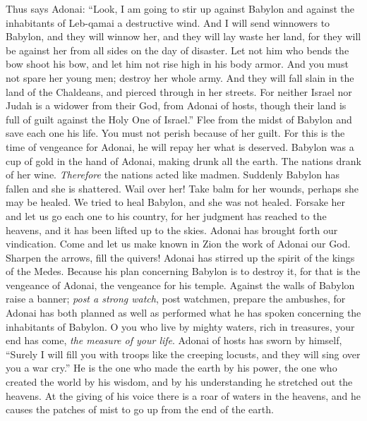 \begin{biblechapter} %
\verse Thus says Adonai:
\verse “Look, I am going to stir up against Babylon 
and against the inhabitants of Leb-qamai a destructive wind.
\verse And I will send winnowers to Babylon, 
and they will winnow her, 
and they will lay waste her land, 
for they will be against her from all sides on the day of disaster.
\verse Let not him who bends the bow shoot his bow, 
and let him not rise high in his body armor. 
And you must not spare her young men; 
destroy her whole army.
\verse And they will fall slain in the land of the Chaldeans, 
and pierced through in her streets.
\verse For neither Israel nor Judah is a widower from their God, 
from Adonai of hosts, 
though their land is full of guilt 
against the Holy One of Israel.”
\verse Flee from the midst of Babylon and save each one his life. 
You must not perish because of her guilt. 
For this is the time of vengeance for Adonai, 
he will repay her what is deserved.
\verse Babylon was a cup of gold in the hand of Adonai, 
making drunk all the earth. 
The nations drank of her wine. 
\textit{Therefore} the nations acted like madmen.
\verse Suddenly Babylon has fallen and she is shattered. 
Wail over her! 
Take balm for her wounds, 
perhaps she may be healed.
\verse We tried to heal Babylon, and she was not healed. 
Forsake her and let us go each one to his country, 
for her judgment has reached to the heavens, 
and it has been lifted up to the skies.
\verse Adonai has brought forth our vindication. 
Come and let us make known in Zion the work of Adonai our God.
\verse Sharpen the arrows, fill the quivers! 
Adonai has stirred up the spirit of the kings of the Medes. 
Because his plan concerning Babylon is to destroy it, 
for that is the vengeance of Adonai, 
the vengeance for his temple.
\verse Against the walls of Babylon raise a banner; 
\textit{post a strong watch}, post watchmen, prepare the ambushes, 
for Adonai has both planned as well as performed 
what he has spoken concerning the inhabitants of Babylon.
\verse O you who live by mighty waters, rich in treasures, 
your end has come, \textit{the measure of your life}.
\verse Adonai of hosts has sworn by himself, 
“Surely I will fill you with troops like the creeping locusts, 
and they will sing over you a war cry.”
\verse He is the one who made the earth by his power, 
the one who created the world by his wisdom, 
and by his understanding he stretched out the heavens.
\verse At the giving of his voice 
there is a roar of waters in the heavens, 
and he causes the patches of mist 
to go up from the end of the earth. 

\end{biblechapter}
